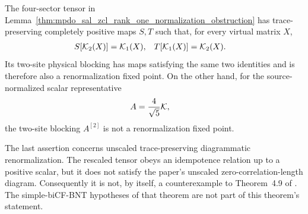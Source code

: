 \begin{lemma}
    \label{thm:mpdo_four_sector_witness_rfp}
    \leanok
    The four-sector tensor in
    Lemma~\ref{thm:mpdo_sal_zcl_rank_one_normalization_obstruction} has
    trace-preserving completely positive maps $S,T$ such that, for every
    virtual matrix $X$,
    \begin{align}
        S[\mathcal K_2(X)] & =\mathcal K_1(X),        &
        T[\mathcal K_1(X)] & =\mathcal K_2(X). \notag
    \end{align}
    Its two-site physical blocking has maps satisfying the same two identities
    and is therefore also a renormalization fixed point. On the other hand,
    for the source-normalized scalar representative
    \begin{align}
        A & =\frac4{\sqrt5}\mathcal K, \notag
    \end{align}
    the two-site blocking $A^{[2]}$ is not a renormalization fixed point.

    The last assertion concerns unscaled trace-preserving diagrammatic
    renormalization. The rescaled tensor obeys an idempotence relation up to a
    positive scalar, but it does not satisfy the paper's unscaled
    zero-correlation-length diagram. Consequently it is not, by itself, a
    counterexample to Theorem~4.9 of
    \cite{Cirac2016MPDO_arXiv}. The simple-biCF-BNT hypotheses of that theorem
    are not part of this theorem's statement.
\end{lemma}

